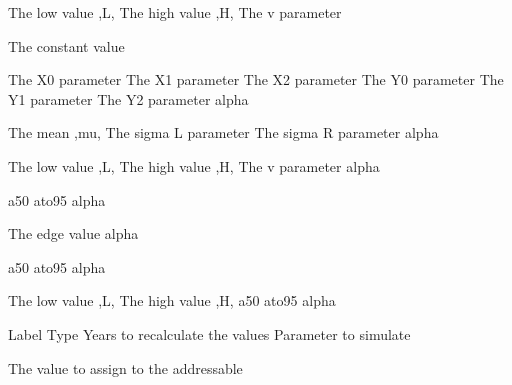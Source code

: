  {The low value ,L,}
 {The high value ,H,}
 {The v parameter}
\par\textbf{}\par
{} {The constant value}
\par\textbf{}\par
{} {The X0 parameter}
 {The X1 parameter}
 {The X2 parameter}
 {The Y0 parameter}
 {The Y1 parameter}
 {The Y2 parameter}
 {alpha}
\par\textbf{}\par
{} {The mean ,mu,}
 {The sigma L parameter}
 {The sigma R parameter}
 {alpha}
\par\textbf{}\par
{} {The low value ,L,}
 {The high value ,H,}
 {The v parameter}
 {alpha}
\par\textbf{}\par
{} {a50}
 {ato95}
 {alpha}
\par\textbf{}\par
{} {The edge value}
 {alpha}
\par\textbf{}\par
{} {a50}
 {ato95}
 {alpha}
\par\textbf{}\par
{} {The low value ,L,}
 {The high value ,H,}
 {a50}
 {ato95}
 {alpha}
\par\par
{} {Label}
 {Type}
 {Years to recalculate the values}
 {Parameter to simulate}
\par\textbf{}\par
{} {The value to assign to the addressable}
\par\par

